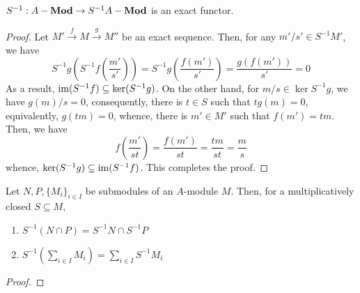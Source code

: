 \begin{theorem}
    $S^{-1}:A-\mathbf{Mod}\to S^{-1}A-\mathbf{Mod}$ is an exact functor.
\end{theorem}
\begin{proof}
    Let $M'\stackrel{f}{\longrightarrow}M\stackrel{g}{\longrightarrow}M''$ be an exact sequence. Then, for any $m'/s'\in S^{-1}M'$, we have 
    \begin{equation*}
        S^{-1}g\left(S^{-1}f\left(\frac{m'}{s'}\right)\right) = S^{-1}g\left(\frac{f(m')}{s'}\right) = \frac{g(f(m'))}{s'} = 0
    \end{equation*}
    As a result, $\operatorname{im}(S^{-1}f)\subseteq\ker(S^{-1}g)$. On the other hand, for $m/s\in\ker S^{-1}g$, we have $g(m)/s = 0$, consequently, there is $t\in S$ such that $tg(m) = 0$, equivalently, $g(tm) = 0$, whence, there is $m'\in M'$ such that $f(m') = tm$. Then, we have 
    \begin{equation*}
        f\left(\frac{m'}{st}\right) = \frac{f(m')}{st} = \frac{tm}{st} = \frac{m}{s}
    \end{equation*}
    whence, $\ker(S^{-1}g)\subseteq\operatorname{im}(S^{-1}f)$. This completes the proof.
\end{proof}

\begin{proposition}
    Let $N,P,\{M_i\}_{i\in I}$ be submodules of an $A$-module $M$. Then, for a multiplicatively closed $S\subseteq M$,
    \begin{enumerate}
        \item $S^{-1}(N\cap P) = S^{-1}N\cap S^{-1}P$
        \item $\displaystyle S^{-1}\left(\sum_{i\in I}M_i\right) = \sum_{i\in I}S^{-1}M_i$
    \end{enumerate}
\end{proposition}
\begin{proof}
    
\end{proof}